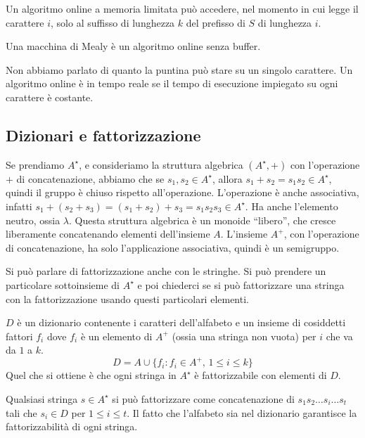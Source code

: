 \begin{defn}
Un algoritmo online a memoria limitata pu\`o accedere, nel momento in cui legge il carattere $i$, solo al suffisso di lunghezza $k$ del prefisso di $S$ di lunghezza $i$.
\end{defn}

Una macchina di Mealy \`e un algoritmo online senza buffer.

Non abbiamo parlato di quanto la puntina pu\`o stare su un singolo carattere. Un algoritmo online \`e in tempo reale se il tempo di esecuzione impiegato su ogni carattere \`e costante.

\subsection{Dizionari e fattorizzazione}

Se prendiamo $A^{\star}$, e consideriamo la struttura algebrica $(A^{\star}, +)$ con l'operazione $+$ di concatenazione, abbiamo che se $s_1, s_2 \in A^{\star}$, allora $s_1 + s_2 = s_1 s_2 \in A^{\star}$, quindi il gruppo \`e chiuso rispetto all'operazione. L'operazione \`e anche associativa, infatti $s_1 + (s_2 + s_3) = (s_1 + s_2) + s_3 = s_1 s_2 s_3 \in A^{\star}$. Ha anche l'elemento neutro, ossia $\lambda$. Questa struttura algebrica \`e un monoide ``libero'', che cresce liberamente concatenando elementi dell'insieme $A$. L'insieme $A^{+}$, con l'operazione di concatenazione, ha solo l'applicazione associativa, quindi \`e un semigruppo.

Si pu\`o parlare di fattorizzazione anche con le stringhe. Si pu\`o prendere un particolare sottoinsieme di $A^{\star}$ e poi chiederci se si pu\`o fattorizzare una stringa con la fattorizzazione usando questi particolari elementi.

\begin{defn}[Dizionario]
$D$ \`e un dizionario contenente i caratteri dell'alfabeto e un insieme di cosiddetti fattori $f_i$ dove $f_i$ \`e un elemento di $A^+$ (ossia una stringa non vuota) per $i$ che va da $1$ a $k$.
\[
D = A \cup \{ f_i : f_i \in A^{+} , \, 1 \le i \le k \}
\]
Quel che si ottiene \`e che ogni stringa in $A^{\star}$ \`e fattorizzabile con elementi di $D$.
\end{defn}
Qualsiasi stringa $s \in A^{\star}$ si pu\`o fattorizzare come concatenazione di $s_1 s_2 \dots s_i \dots s_t$ tali che $s_i \in D$ per $1 \le i \le t$. Il fatto che l'alfabeto sia nel dizionario garantisce la fattorizzabilit\`a di ogni stringa.

